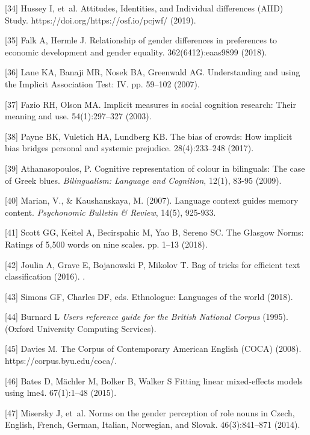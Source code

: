 \documentclass[9pt,twocolumn]{pnas-new}
\begin{document}
[34] Hussey I, et~al.  {A}ttitudes, {I}dentities, and {I}ndividual differences
  ({AIID}) {S}tudy.
\newblock https://doi.org/https://osf.io/pcjwf/ (2019).

[35] Falk A, Hermle J. Relationship of gender differences in preferences to
  economic development and gender equality.
 362(6412):eaas9899 (2018).

[36] Lane KA, Banaji MR, Nosek BA, Greenwald AG. Understanding and using the
  {I}mplicit {A}ssociation {T}est: {IV}.
 pp. 59--102 (2007).

[37] Fazio RH, Olson MA. Implicit measures in social cognition research: Their
  meaning and use.
 54(1):297--327 (2003).

[38] Payne BK, Vuletich HA, Lundberg KB. The bias of crowds: How implicit bias
  bridges personal and systemic prejudice.
 28(4):233--248  (2017).

[39] Athanasopoulos, P. Cognitive representation of colour in bilinguals: The case of Greek blues. {\it Bilingualism: Language and Cognition}, 12(1), 83-95 (2009).

[40] Marian, V., \& Kaushanskaya, M. (2007). Language context guides memory content. {\it Psychonomic Bulletin \& Review}, 14(5), 925-933.

[41] Scott GG, Keitel A, Becirspahic M, Yao B, Sereno SC. The {G}lasgow
  {N}orms: Ratings of 5,500 words on nine scales.
 pp. 1--13 (2018).

[42] Joulin A, Grave E, Bojanowski P, Mikolov T. Bag of tricks for efficient
  text classification (2016).
.

[43] Simons GF, Charles DF, eds. Ethnologue: Languages of the world (2018).

[44] Burnard L  {\em Users reference guide for the British National Corpus} (1995).
\newblock (Oxford University Computing Services).

[45] Davies M. The {C}orpus of {C}ontemporary {A}merican {E}nglish ({COCA}) (2008).
\newblock https://corpus.byu.edu/coca/.

[46] Bates D, M{\"a}chler M, Bolker B, Walker S  Fitting linear mixed-effects
  models using {lme4}.
 67(1):1--48 (2015).

[47] Misersky J, et~al.  Norms on the gender perception of role nouns in
  {C}zech, {E}nglish, {F}rench, {G}erman, {I}talian, {N}orwegian, and {S}lovak.
 46(3):841--871 (2014).
\end{document}
